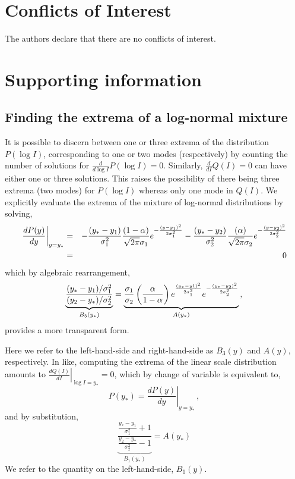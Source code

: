 \documentclass[11pt,a4paper,draft]{article}
\begin{document}
\section*{Conflicts of Interest}
The authors declare that there are no conflicts of interest.


%




\newpage
\section*{Supporting information}
%

\subsection*{Finding the extrema of a log-normal mixture}
It is possible to discern between one or three extrema of the distribution $P(\log I)$, corresponding to one or two modes (respectively) by counting the number of solutions for $\frac{d}{d\log I}P(\log I) = 0$. Similarly, $\frac{d}{dI}Q(I)=0$ can have either one or three solutions. This raises the possibility of there being three extrema (two modes) for $P(\log I)$ whereas only one mode in $Q(I)$. We explicitly evaluate the extrema of the mixture of log-normal distributions by solving,
%
\begin{eqnarray} \nonumber
  \left.\frac{d P(y)}{dy} \right\vert_{y=y_*}&=&
  -\frac{(y_* - y_1)}{\sigma_1^2} \frac{(1-\alpha)}{\sqrt{2\pi}\sigma_1}  \gauss{1}{y_1}{y} -
  \frac{(y_* - y_2)}{\sigma_2^2} \frac{(\alpha)}{\sqrt{2\pi}\sigma_2} \gauss{2}{y_2}{y}\nonumber\\
  &=& 0\nonumber
\end{eqnarray}
%
which by algebraic rearrangement,
%
\begin{equation} 
  \underbrace{\frac{(y_* - y_1) / \sigma_1^2}{(y_2-y_*)/\sigma_2^2}}_{B_3(y_*)} =
    \underbrace{\frac{\sigma_1}{\sigma_2}
    \left(\frac{\alpha}{1-\alpha}\right)
    e^{\frac{(y_*-y1)^2}{2\sigma_1 ^2}}\gauss{2}{y_2}{y_*}}_{A(y_*)}\,,
\label{eq:extremaP}
\end{equation}
%
provides a more transparent form.  

Here we refer to the left-hand-side and right-hand-side as $B_3(y)$ and $A(y)$, respectively. In like, computing the extrema of the linear scale distribution amounts to $\left.\frac{d Q(I)}{dI} \right\vert_{\log I= y_*} = 0$, which by change of variable is equivalent to,
%
\begin{equation}
P(y_*) = \left.\frac{d P(y)}{dy}\right\vert_{y = y_*}\,,
\label{eq:QExtremaStrange}
\end{equation}
%
and by substitution,
%
\begin{equation}
  \underbrace{\frac{\frac{y_*-y_1}{\sigma_1^2}+1}{\frac{y_2-y_*}{\sigma_2^2}-1}}_{B_1(y_*)} = A(y_*) 
  \label{eq:extremaQ}
\end{equation}
%
We refer to the quantity on the left-hand-side, $B_1(y)$.
\end{document}
